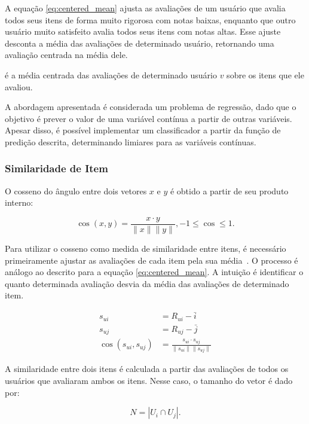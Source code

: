 A equação \ref{eq:centered_mean} ajusta as avaliações de um usuário
que avalia todos seus itens de forma muito rigorosa com notas baixas, enquanto
que outro usuário muito satisfeito avalia todos seus itens com notas altas. Esse
ajuste desconta a média das avaliações de determinado usuário, retornando uma avaliação
centrada na média dele.

é a média centrada das avaliações de
determinado usuário $v$ sobre os itens que ele avaliou.

A abordagem apresentada é considerada um problema de regressão, dado que o objetivo é prever
o valor de uma variável contínua a partir de outras variáveis. Apesar disso, é
possível implementar um classificador a partir da função de predição descrita,
determinando limiares para as variáveis contínuas.

\subsubsection{Similaridade de Item}

O cosseno do ângulo entre dois vetores $x$ e $y$ é obtido a partir de seu
produto interno:

\begin{equation}
    \cos(x,y) = \frac{x \cdot y}{\|x\| \|y\|}, -1 \leq \cos \leq 1.
\end{equation}

Para utilizar o cosseno como medida de similaridade entre itens, é necessário
primeiramente ajustar as avaliações de cada item pela sua
média~\cite{aggarwal2016recommender}. O processo é análogo ao descrito para a
equação \ref{eq:centered_mean}. A intuição é identificar o quanto determinada
avaliação desvia da média das avaliações de determinado item.

\begin{align}
    s_{ui} &= R_{ui} - \bar{i} \\
    s_{uj} &= R_{uj} - \bar{j} \\
    \cos(s_{ui},s_{uj}) &= \frac{s_{ui} \cdot s_{uj}}{\|s_{ui}\| \|s_{uj}\|}
\end{align}

A similaridade entre dois itens é calculada a partir das avaliações de todos os
usuários que avaliaram ambos os itens. Nesse caso, o tamanho do vetor é dado por:

\begin{equation}
    N = |U_i \cap U_j|.
\end{equation}

